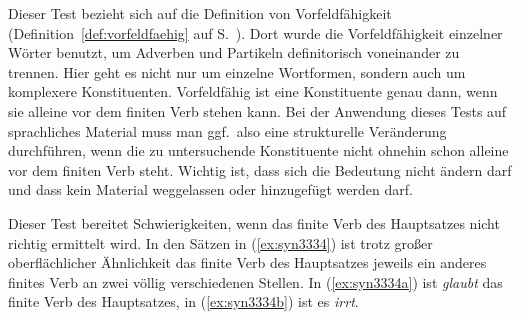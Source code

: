 
Dieser Test bezieht sich auf die Definition von Vorfeldfähigkeit (Definition~\ref{def:vorfeldfaehig} auf S.~\pageref{def:vorfeldfaehig}).
Dort wurde die Vorfeldfähigkeit einzelner Wörter benutzt, um Adverben und Partikeln definitorisch voneinander zu trennen.
Hier geht es nicht nur um einzelne Wortformen, sondern auch um komplexere Konstituenten.
Vorfeldfähig ist eine Konstituente genau dann, wenn sie alleine vor dem finiten Verb stehen kann.
Bei der Anwendung dieses Tests auf sprachliches Material muss man ggf.\ also eine strukturelle Veränderung durchführen, wenn die zu untersuchende Konstituente nicht ohnehin schon alleine vor dem finiten Verb steht.
Wichtig ist, dass sich die Bedeutung nicht ändern darf und dass kein Material weggelassen oder hinzugefügt werden darf.

\begin{exe}
  \ex\label{ex:syn3333}
  \begin{xlist}
  \end{xlist}
\end{exe}

Dieser Test bereitet Schwierigkeiten, wenn das finite Verb des Hauptsatzes nicht richtig ermittelt wird.
In den Sätzen in (\ref{ex:syn3334}) ist trotz großer oberflächlicher Ähnlichkeit das finite Verb des Hauptsatzes jeweils ein anderes finites Verb an zwei völlig verschiedenen Stellen.
In (\ref{ex:syn3334a}) ist \textit{glaubt} das finite Verb des Hauptsatzes, in (\ref{ex:syn3334b}) ist es \textit{irrt}.

\begin{exe}
  \ex\label{ex:syn3334}
  \begin{xlist}
  \end{xlist}
\end{exe}

